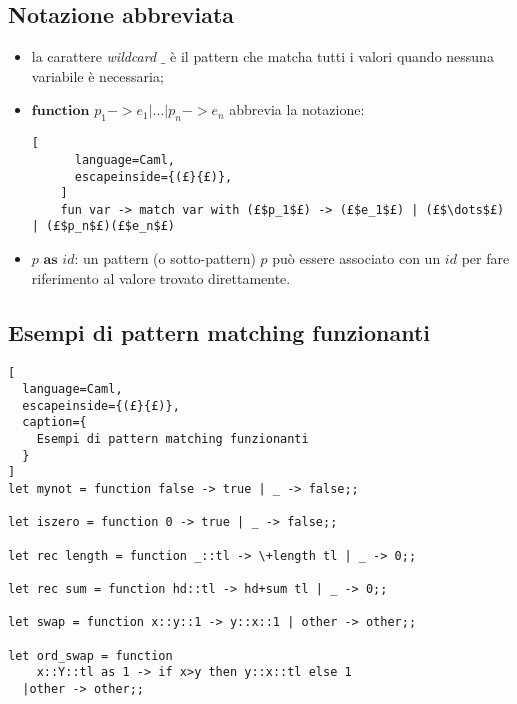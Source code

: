 \subsection{Notazione abbreviata}
\begin{itemize}
  \item la carattere \textit{wildcard} $\_$ è il pattern che matcha tutti i
    valori quando nessuna variabile è necessaria;
  \item $\textbf{function } p_1->e_1|\dots|p_n->e_n$ abbrevia la notazione:
    \begin{lstlisting}[
      language=Caml,
      escapeinside={(£}{£)},
    ]
    fun var -> match var with (£$p_1$£) -> (£$e_1$£) | (£$\dots$£) | (£$p_n$£)(£$e_n$£)
    \end{lstlisting}
  \item $p \textbf{ as } id$: un pattern (o sotto-pattern) $p$ può essere
    associato con un $id$ per fare riferimento al valore trovato direttamente.
\end{itemize}

\subsection{Esempi di pattern matching funzionanti}
\begin{lstlisting}[
  language=Caml,
  escapeinside={(£}{£)},
  caption={
    Esempi di pattern matching funzionanti
  }
]
let mynot = function false -> true | _ -> false;;

let iszero = function 0 -> true | _ -> false;;

let rec length = function _::tl -> \+length tl | _ -> 0;;

let rec sum = function hd::tl -> hd+sum tl | _ -> 0;;

let swap = function x::y::1 -> y::x::1 | other -> other;;

let ord_swap = function
    x::Y::tl as 1 -> if x>y then y::x::tl else 1
  |other -> other;;
\end{lstlisting}
